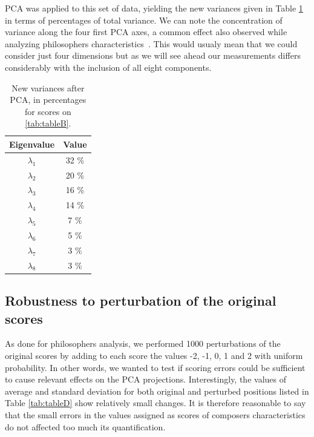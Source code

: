 \documentclass[
 aip,
 jmp,
 amsmath,amssymb,
 reprint,
]{revtex4-1}
\begin{document}
PCA was applied to this set of data, yielding the new variances given
in Table \ref{tab:tableC} in terms of percentages of total variance.
We can note the concentration of variance along the four
first PCA axes, a common effect also observed while analyzing
philosophers characteristics~\cite{Fabbri}. This would usualy mean that we could
consider just four dimensions but as we will see ahead our measurements
differs considerably with the inclusion of all eight components.

\begin{table}[ht]
\caption{\label{tab:tableC}New variances after PCA, in percentages for
  scores on \ref{tab:tableB}.}

\begin{tabular}{|c||c|}
\hline
Eigenvalue  & Value     \\ \hline

$\lambda_1$ &  32 \% \\
$\lambda_2$ &  20 \% \\
$\lambda_3$ &  16 \% \\
$\lambda_4$ &  14 \% \\
$\lambda_5$ &   7 \% \\
$\lambda_6$ &   5 \% \\
$\lambda_7$ &   3 \% \\
$\lambda_8$ &   3 \% \\
\hline

\end{tabular}
\end{table}

\subsection{Robustness to perturbation of the original scores}

As done for philosophers analysis, we performed 1000 perturbations of
the original scores by adding to each score the values -2, -1, 0, 1 and 2 with
uniform probability. In other words, we wanted to test if scoring
errors could be sufficient to cause relevant effects
on the PCA projections. Interestingly, the values of average and
standard deviation for both original and perturbed positions listed in Table
\ref{tab:tableD} show relatively small changes. It is therefore
reasonable to say that the small errors in the values assigned as scores of composers
characteristics do not affected too much its quantification.
\end{document}

